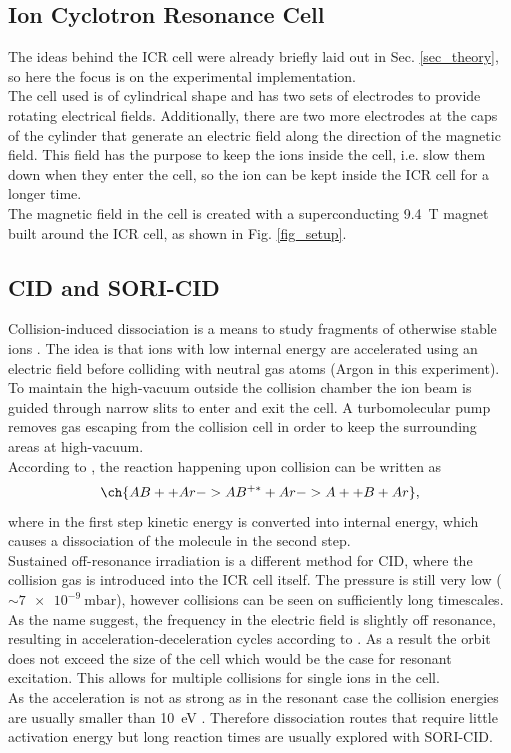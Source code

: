 \documentclass[a4paper,10pt]{article}
\begin{document}
\subsection{Ion Cyclotron Resonance Cell}
The ideas behind the ICR cell were already briefly laid out in Sec. \ref{sec_theory}, so here the focus is on the experimental implementation. \\
The cell used is of cylindrical shape and has two sets of electrodes to provide rotating electrical fields. Additionally, there are two more electrodes at the caps of the cylinder that generate an electric field along the direction of the magnetic field. This field has the purpose to keep the ions inside the cell, i.e. slow them down when they enter the cell, so the ion can be kept inside the ICR cell for a longer time. \\
The magnetic field in the cell is created with a superconducting \SI{9.4}{\tesla} magnet built around the ICR cell, as shown in Fig. \ref{fig_setup}.

\subsection{CID and SORI-CID}
Collision-induced dissociation is a means to study fragments of  otherwise stable ions \cite{ms_book}. The idea is that ions with low internal energy are accelerated using an electric field before colliding with neutral gas atoms (Argon in this experiment). To maintain the high-vacuum outside the collision chamber the ion beam is guided through narrow slits to enter and exit the cell. A turbomolecular pump removes gas escaping from the collision cell in order to keep the surrounding areas at high-vacuum. \\
According to \cite{ms_book}, the reaction happening upon collision can be written as
\begin{equation}
	\ch{AB+ + Ar -> AB^{+*} + Ar -> A+ + B + Ar},
\end{equation}
where in the first step kinetic energy is converted into internal energy, which causes a dissociation of the molecule in the second step. \\
Sustained off-resonance irradiation is a different method for CID, where the collision gas is introduced into the ICR cell itself. The pressure is still very low ($\sim \SI{7e-9}{\milli \bar}$), however collisions can be seen on sufficiently long timescales. As the name suggest, the frequency in the electric field is slightly off resonance, resulting in acceleration-deceleration cycles according to \cite{ms_book}. As a result the orbit does not exceed the size of the cell which would be the case for resonant excitation. This allows for multiple collisions for single ions in the cell. \\
As the acceleration is not as strong as in the resonant case the collision energies are usually smaller than \SI{10}{\electronvolt} \cite{ms_book}. Therefore dissociation routes that require little activation energy but long reaction times are usually explored with SORI-CID.
\end{document}
